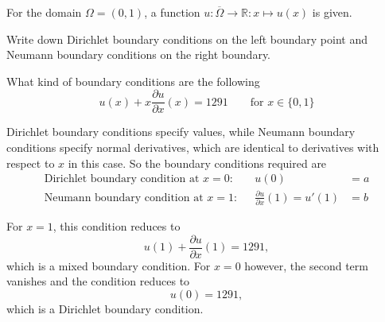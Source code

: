 For the domain $\Omega = (0,1)$, a function
$u\colon\overline{\Omega}\to\mathbb{R}:x\mapsto u(x)$ is given.
\begin{teilaufgaben}
\item
Write down Dirichlet boundary conditions on the left
boundary point and Neumann boundary conditions on the right boundary.
\item
What kind of boundary conditions are the following
\[
u(x)
+
x\frac{\partial u}{\partial x}(x)
=
1291
\qquad
\text{for $x\in \{0,1\}$}
\]
\end{teilaufgaben}

\begin{loesung}
\begin{teilaufgaben}
\item
Dirichlet boundary conditions specify values, while Neumann
boundary conditions specify normal derivatives, which are identical to
derivatives with respect to $x$ in this case.
So the boundary conditions required are
\begin{align*}
\text{Dirichlet boundary condition at $x=0$:}&
&
u(0)&= a
\\
\text{Neumann boundary condition at $x=1$:}&
&
\frac{\partial u}{\partial x}(1)=u'(1)&= b
\end{align*}
\item
For $x=1$, this condition reduces to
\[
u(1) + \frac{\partial u}{\partial x}(1)=1291,
\]
which is a mixed boundary condition.
For $x=0$ however, the second term vanishes and the condition reduces to
\[
u(0) = 1291,
\]
which is a Dirichlet boundary condition.
\qedhere
\end{teilaufgaben}
\end{loesung}


